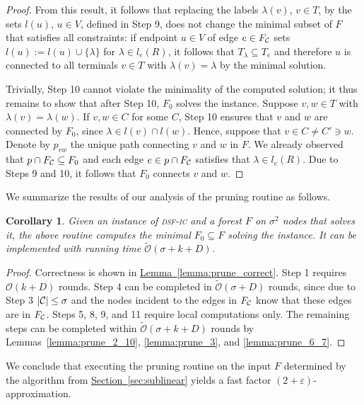 \documentclass[letterpaper,11pt]{article}
\newtheorem{corollary}[theorem]{Corollary}
\newcommand{\namedref}[2]{\hyperref[#2]{#1~\ref*{#2}}}
\newcommand{\sectionref}[1]{\namedref{Section}{#1}}
\newcommand{\lemmaref}[1]{\namedref{Lemma}{#1}}
\newcommand{\BO}{\mathcal{O}}
\newcommand{\sO}{\tilde{\mathcal{O}}}
\newcommand{\Comp}{\lambda}
\newcommand{\sfic}{\textsc{dsf-ic}\xspace}
\begin{document}
\begin{proof}
From this result, it follows that replacing the labels $\Comp(v)$, $v\in T$, by
the sets $l(u)$, $u\in V$, defined in Step 9, does not change the minimal subset
of $F$ that satisfies all constraints: if endpoint $u\in V$ of edge $e\in
F_{\cal C}$ sets $l(u):=l(u)\cup \{\Comp\}$ for $\Comp \in l_e(R)$, it follows
that $T_{\Comp}\subseteq T_e$ and therefore $u$ is connected to all terminals
$v\in T$ with $\Comp(v)=\Comp$ by the minimal solution.

Trivially, Step 10 cannot violate the minimality of the computed solution; it
thus remains to show that after Step 10, $F_0$ solves the instance. Suppose
$v,w\in T$ with $\Comp(v)=\Comp(w)$. If $v,w\in C$ for some $C$, Step 10 ensures
that $v$ and $w$ are connected by $F_0$, since $\Comp\in l(v)\cap l(w)$. Hence,
suppose that $v\in C\neq C'\ni w$. Denote by $p_{vw}$ the unique path connecting
$v$ and $w$ in $F$. We already observed that $p\cap F_{\cal C} \subseteq F_0$
and each edge $e\in p\cap F_{\cal C}$ satisfies that $\Comp\in l_e(R)$. Due to
Steps 9 and 10, it follows that $F_0$ connects $v$ and $w$.
\end{proof}

We summarize the results of our analysis of the pruning routine as follows.

\begin{corollary}\label{coro:prune}
Given an instance of \sfic and a forest $F$ on $\sigma^2$ nodes that solves
it, the above routine computes the minimal $F_0\subseteq F$ solving the
instance. It can be implemented with running time $\sO(\sigma+k+D)$.
\end{corollary}
\begin{proof}
Correctness is shown in \lemmaref{lemma:prune_correct}. Step 1 requires
$\BO(k+D)$ rounds. Step 4 can be completed in $\sO(\sigma+D)$ rounds, since due
to Step 3 $|{\cal C}|\leq \sigma$ and the nodes incident to the edges in
$F_{\cal C}$ know that these edges are in $F_{\cal C}$. Steps 5, 8, 9, and 11
require local computations only. The remaining steps can be completed within
$\sO(\sigma+k+D)$ rounds by Lemmas~\ref{lemma:prune_2_10}, \ref{lemma:prune_3},
and \ref{lemma:prune_6_7}.
\end{proof}

We conclude that executing the pruning routine on the input $F$ determined by
the algorithm from \sectionref{sec:sublinear} yields a fast factor
$(2+\varepsilon)$-approximation.
\end{document}
